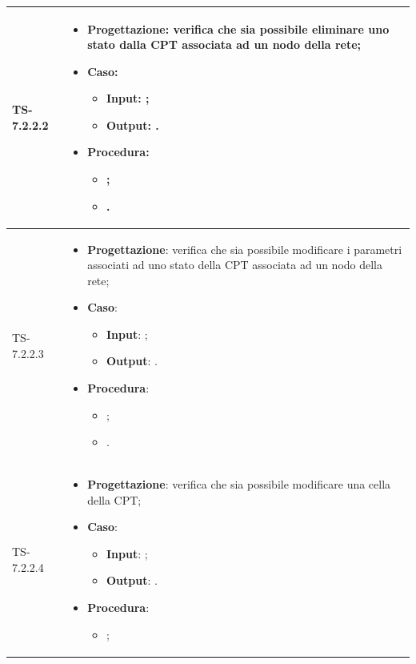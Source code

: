 \begin{longtable}{|C{2.5cm}|C{13cm}|}
	\\
	\hline
	{TS-7.2.2.2} &
\begin{itemize}
	\item \textbf{Progettazione}: verifica che sia possibile eliminare uno
	stato dalla CPT associata ad un nodo della rete;
	\item \textbf{Caso}: 
	\begin{itemize}
		\item \textbf{Input}: ;
		\item \textbf{Output}: .
	\end{itemize}
	\item \textbf{Procedura}:
	\begin{itemize}
		\item ;
		\item .
	\end{itemize} 
\end{itemize}
	   \\
	\hline
	{TS-7.2.2.3} & 
\begin{itemize}
	\item \textbf{Progettazione}: verifica che sia possibile modificare i
	parametri associati ad uno stato della CPT associata ad un nodo della rete;
	\item \textbf{Caso}: 
	\begin{itemize}
		\item \textbf{Input}: ;
		\item \textbf{Output}: .
	\end{itemize}
	\item \textbf{Procedura}:
	\begin{itemize}
		\item ;
		\item .
	\end{itemize} 
\end{itemize}
	 \\
	\hline
	{TS-7.2.2.4} & 
\begin{itemize}
	\item \textbf{Progettazione}: verifica che sia possibile modificare una
	cella della CPT;
	\item \textbf{Caso}: 
	\begin{itemize}
		\item \textbf{Input}: ;
		\item \textbf{Output}: .
	\end{itemize}
	\item \textbf{Procedura}:
	\begin{itemize}
		\item ;

\end{itemize}
\end{itemize}
\end{longtable}
